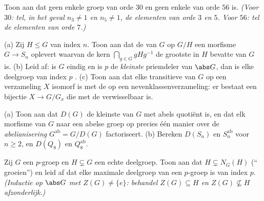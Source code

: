 \begin{exercise}[$\star\star$]\label{exo:b3:groups:7}
Toon aan dat geen enkele groep van orde $30$ en geen enkele van
orde $56$  is. \emph{(Voor $30$: tel, in het geval $n_3
\neq 1$ en $n_5 \neq 1$, de elementen van orde $3$ en $5$. Voor
$56$: tel de elementen van orde $7$.)}
\end{exercise}

\begin{exercise}[$\star\star$]\label{exo:b3:groups:8}
(a) Zij $H \leq G$ van index $n$. Toon aan dat de  van $G$
op $G/H$ een morfisme $G \to S_n$ oplevert waarvan de kern
$\bigcap_{g \in G} gHg^{-1}$ de grootste in $H$ bevatte
 van $G$ is.
(b) Leid af: is $G$ eindig en is $p$ de \emph{kleinste} priemdeler
van $\abs G$, dan is elke deelgroep van index $p$ .
(c) Toon aan dat elke transitieve  van $G$ op een
verzameling $X$ isomorf is met de  op een
nevenklassenverzameling: er bestaat een bijectie $X \to G/G_x$ die
met de  verwisselbaar is.
\end{exercise}

\begin{exercise}[$\star\star$]\label{exo:b3:groups:9}
(a) Toon aan dat $D(G)$ de kleinste  van $G$ met abels
quotiënt is, en dat elk morfisme van $G$ naar een abelse groep op
precies één manier over de \emph{abelianisering}
$G^{\mathrm{ab}} = G/D(G)$ factoriseert.
(b) Bereken $D(S_n)$ en $S_n^{\mathrm{ab}}$ voor $n \geq 2$, en
$D(Q_8)$ en $Q_8^{\mathrm{ab}}$.
\end{exercise}

\begin{exercise}[$\star\star$]\label{exo:b3:groups:10}
Zij $G$ een $p$-groep en $H \subsetneq G$ een echte deelgroep. Toon
aan dat $H \subsetneq N_G(H)$ (`` groeien'') en leid
af dat elke maximale deelgroep van een $p$-groep  is van
index $p$. \emph{(Inductie op $\abs G$ met $Z(G) \neq \{e\}$:
behandel $Z(G) \subseteq H$ en $Z(G) \not\subseteq H$
afzonderlijk.)}
\end{exercise}


